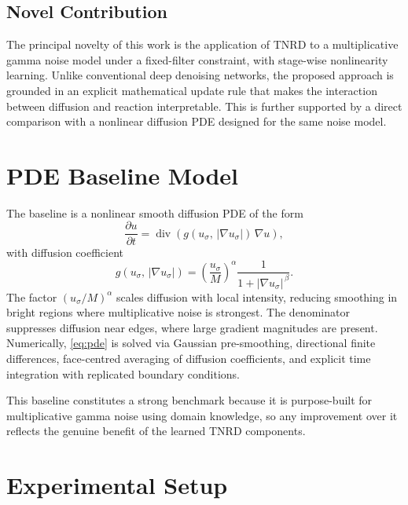 \documentclass[conference]{IEEEtran}
\begin{document}
\subsection{Novel Contribution}
The principal novelty of this work is the application of TNRD to a multiplicative
gamma noise model under a fixed-filter constraint, with stage-wise nonlinearity
learning. Unlike conventional deep denoising networks, the proposed approach is
grounded in an explicit mathematical update rule that makes the interaction between
diffusion and reaction interpretable. This is further supported by a direct
comparison with a nonlinear diffusion PDE designed for the same noise model.

\section{PDE Baseline Model}
The baseline is a nonlinear smooth diffusion PDE of the form
\begin{equation}
  \frac{\partial u}{\partial t}
    = \operatorname{div}\!\left(g(u_\sigma,\,|\nabla u_\sigma|)\,\nabla u\right),
  \label{eq:pde}
\end{equation}
with diffusion coefficient
\begin{equation}
  g(u_\sigma,\,|\nabla u_\sigma|)
    = \left(\frac{u_\sigma}{M}\right)^{\!\alpha}
      \frac{1}{1 + |\nabla u_\sigma|^{\,\beta}}.
  \label{eq:diffusion_coeff}
\end{equation}
The factor $(u_\sigma/M)^\alpha$ scales diffusion with local intensity, reducing
smoothing in bright regions where multiplicative noise is strongest. The denominator
suppresses diffusion near edges, where large gradient magnitudes are present.
Numerically, \eqref{eq:pde} is solved via Gaussian pre-smoothing, directional
finite differences, face-centred averaging of diffusion coefficients, and explicit
time integration with replicated boundary conditions.

This baseline constitutes a strong benchmark because it is purpose-built for
multiplicative gamma noise using domain knowledge, so any improvement over it
reflects the genuine benefit of the learned TNRD components.

\section{Experimental Setup}
\end{document}

